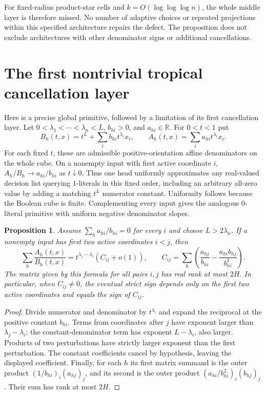 \documentclass[11pt]{article}
\newtheorem{proposition}[theorem]{Proposition}
\begin{document}
For fixed-radius product-star cells and
$k=O(\log\log\log n)$, the whole middle layer is therefore missed.
No number of adaptive choices or repeated projections within this
specified architecture repairs the defect. The proposition does not
exclude architectures with other denominator signs or additional
cancellations.

\section{The first nontrivial tropical cancellation layer}

Here is a precise global primitive, followed by a limitation of its
first cancellation layer. Let $0<\lambda_1<\cdots<\lambda_n<L$,
$b_{hi}>0$, and $a_{hi}\in\mathbb R$. For $0<t<1$ put
\[
 B_h(t,x)=t^L+\sum_i b_{hi}t^{\lambda_i}x_i,
 \qquad A_h(t,x)=\sum_i a_{hi}t^{\lambda_i}x_i.
\]
For each fixed $t$, these are admissible positive-orientation affine
denominators on the whole cube. On a nonempty input with first active
coordinate $i$, $A_h/B_h\to a_{hi}/b_{hi}$ as $t\downarrow0$.
Thus one head uniformly approximates any real-valued decision list
querying $1$-literals in this fixed order, including an arbitrary
all-zero value by adding a matching $t^L$ numerator constant.
Uniformity follows because the Boolean cube is finite. Complementing
every input gives the analogous $0$-literal primitive with uniform
negative denominator slopes.

\begin{proposition}\label{prop:tropical-pair-rank}
Assume $\sum_h a_{hi}/b_{hi}=0$ for every $i$ and choose
$L>2\lambda_n$. If a nonempty input has first two active coordinates
$i<j$, then
\[
 \sum_h\frac{A_h(t,x)}{B_h(t,x)}
   =t^{\lambda_j-\lambda_i}(C_{ij}+o(1)),\qquad
 C_{ij}=\sum_h\left(\frac{a_{hj}}{b_{hi}}
                    -\frac{a_{hi}b_{hj}}{b_{hi}^2}\right).
\]
The matrix given by this formula for all pairs $i,j$ has real rank at
most $2H$. In particular, when $C_{ij}\neq0$, the eventual strict
sign depends only on the first two active coordinates and equals the
sign of $C_{ij}$.
\end{proposition}

\begin{proof}
Divide numerator and denominator by $t^{\lambda_i}$ and expand the
reciprocal at the positive constant $b_{hi}$. Terms from coordinates
after $j$ have exponent larger than $\lambda_j-\lambda_i$; the
constant-denominator term has exponent $L-\lambda_i$, also larger.
Products of two perturbations have strictly larger exponent than the
first perturbation. The constant coefficients cancel by hypothesis,
leaving the displayed coefficient. Finally, for each $h$ its first
matrix summand is the outer product
$(1/b_{hi})_i(a_{hj})_j$, and its second is the outer product
$(a_{hi}/b_{hi}^2)_i(b_{hj})_j$. Their sum has rank at most $2H$.
\end{proof}
\end{document}
